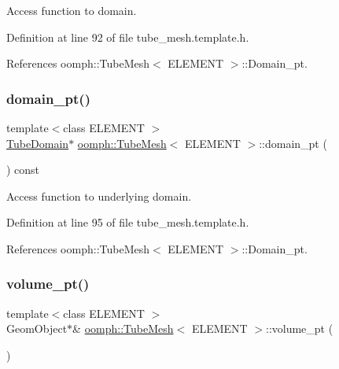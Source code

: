 Access function to domain. 



Definition at line 92 of file tube\+\_\+mesh.\+template.\+h.



References oomph\+::\+Tube\+Mesh$<$ E\+L\+E\+M\+E\+N\+T $>$\+::\+Domain\+\_\+pt.

\mbox{\label{classoomph_1_1TubeMesh_a223a82a89304553d71b279aa6fe045fd}} 
\subsubsection{\texorpdfstring{domain\+\_\+pt()}{domain\_pt()}\hspace{0.1cm}{\footnotesize\ttfamily [2/2]}}
{\footnotesize\ttfamily template$<$class E\+L\+E\+M\+E\+NT $>$ \\
\hyperlink{classoomph_1_1TubeDomain}{Tube\+Domain}$\ast$ \hyperlink{classoomph_1_1TubeMesh}{oomph\+::\+Tube\+Mesh}$<$ E\+L\+E\+M\+E\+NT $>$\+::domain\+\_\+pt (\begin{DoxyParamCaption}{ }\end{DoxyParamCaption}) const\hspace{0.3cm}{\ttfamily [inline]}}



Access function to underlying domain. 



Definition at line 95 of file tube\+\_\+mesh.\+template.\+h.



References oomph\+::\+Tube\+Mesh$<$ E\+L\+E\+M\+E\+N\+T $>$\+::\+Domain\+\_\+pt.

\mbox{\label{classoomph_1_1TubeMesh_a152971dbd327aaf840fd157bad87d995}} 
\subsubsection{\texorpdfstring{volume\+\_\+pt()}{volume\_pt()}}
{\footnotesize\ttfamily template$<$class E\+L\+E\+M\+E\+NT $>$ \\
Geom\+Object$\ast$\& \hyperlink{classoomph_1_1TubeMesh}{oomph\+::\+Tube\+Mesh}$<$ E\+L\+E\+M\+E\+NT $>$\+::volume\+\_\+pt (\begin{DoxyParamCaption}{ }\end{DoxyParamCaption})\hspace{0.3cm}{\ttfamily [inline]}}



